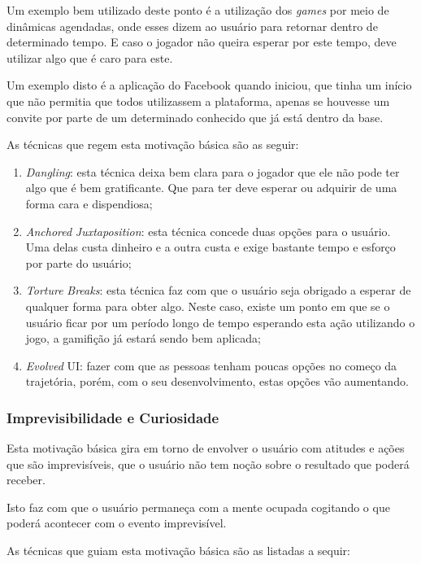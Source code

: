 Um exemplo bem utilizado deste ponto é a utilização dos \textit{games} por meio de dinâmicas
agendadas, onde esses dizem ao usuário para retornar dentro de determinado tempo.
E caso o jogador não queira esperar por este tempo, deve utilizar algo que é caro
para este.

Um exemplo disto é a aplicação do Facebook quando iniciou, que tinha um início que não permitia
que todos utilizassem a plataforma, apenas se houvesse um convite por parte de um
determinado conhecido que já está dentro da base.

As técnicas que regem esta motivação básica são as seguir:

\begin{enumerate}
    \item \textit{Dangling}: esta técnica deixa bem clara para o jogador que ele não pode
        ter algo que é bem gratificante. Que para ter deve esperar ou adquirir
        de uma forma cara e dispendiosa;
    \item \textit{Anchored} \textit{Juxtaposition}: esta técnica concede duas opções para o usuário.
        Uma delas custa dinheiro e a outra custa e exige bastante tempo e esforço
        por parte do usuário;
    \item \textit{Torture} \textit{Breaks}: esta técnica faz com que o usuário seja obrigado a esperar
        de qualquer forma para obter algo. Neste caso, existe um ponto em que
        se o usuário ficar por um período longo de tempo esperando esta ação
        utilizando o jogo, a gamifição já estará sendo bem aplicada;
    \item \textit{Evolved} UI: fazer com que as pessoas tenham poucas opções no começo da
        trajetória, porém, com o seu desenvolvimento, estas opções vão aumentando.
\end{enumerate}

\subsubsection{Imprevisibilidade e Curiosidade}
\label{sub:imprevisibilidadeecuriosidade}
Esta motivação básica gira em torno de envolver o usuário com atitudes e ações que são
imprevisíveis, que o usuário não tem noção sobre o resultado que poderá receber.

Isto faz com que o usuário permaneça com a mente ocupada cogitando o que poderá
acontecer com o evento imprevisível.

As técnicas que guiam esta motivação básica são as listadas a sequir:


